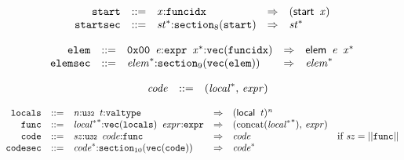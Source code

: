 \vspace{1ex}

$$
\begin{array}{@{}l@{}rrlll@{}l@{}}
& {\mathtt{start}} &::=& {\mathit{x}}{:}{\mathtt{funcidx}} &\Rightarrow& (\mathsf{start}~\,{\mathit{x}}) \\
& {\mathtt{startsec}} &::=& {{\mathit{st}}^\ast}{:}{{\mathtt{section}}}_{8}({\mathtt{start}}) &\Rightarrow& {{\mathit{st}}^\ast} \\
\end{array}
$$

\vspace{1ex}

$$
\begin{array}{@{}l@{}rrlll@{}l@{}}
& {\mathtt{elem}} &::=& \mathtt{0x00}~\,{\mathit{e}}{:}{\mathtt{expr}}~\,{{\mathit{x}}^\ast}{:}{\mathtt{vec}}({\mathtt{funcidx}}) &\Rightarrow& \mathsf{elem}~\,{\mathit{e}}~\,{{\mathit{x}}^\ast} \\
& {\mathtt{elemsec}} &::=& {{\mathit{elem}}^\ast}{:}{{\mathtt{section}}}_{9}({\mathtt{vec}}({\mathtt{elem}})) &\Rightarrow& {{\mathit{elem}}^\ast} \\
\end{array}
$$

\vspace{1ex}

$$
\begin{array}{@{}lrrl@{}l@{}}
& {\mathit{code}} &::=& ({{\mathit{local}}^\ast},\, {\mathit{expr}}) \\
\end{array}
$$

$$
\begin{array}{@{}l@{}rrlll@{}l@{}}
& {\mathtt{locals}} &::=& {\mathit{n}}{:}{\mathtt{u{\scriptstyle32}}}~\,{\mathit{t}}{:}{\mathtt{valtype}} &\Rightarrow& {(\mathsf{local}~\,{\mathit{t}})^{{\mathit{n}}}} \\
& {\mathtt{func}} &::=& {{{\mathit{local}}^\ast}^\ast}{:}{\mathtt{vec}}({\mathtt{locals}})~\,{\mathit{expr}}{:}{\mathtt{expr}} &\Rightarrow& ({\mathrm{concat}}({{{\mathit{local}}^\ast}^\ast}),\, {\mathit{expr}}) \\
& {\mathtt{code}} &::=& {\mathit{sz}}{:}{\mathtt{u{\scriptstyle32}}}~\,{\mathit{code}}{:}{\mathtt{func}} &\Rightarrow& {\mathit{code}} &\quad
  \mbox{if}~{\mathit{sz}} = ||{\mathtt{func}}|| \\
& {\mathtt{codesec}} &::=& {{\mathit{code}}^\ast}{:}{{\mathtt{section}}}_{10}({\mathtt{vec}}({\mathtt{code}})) &\Rightarrow& {{\mathit{code}}^\ast} \\
\end{array}
$$

